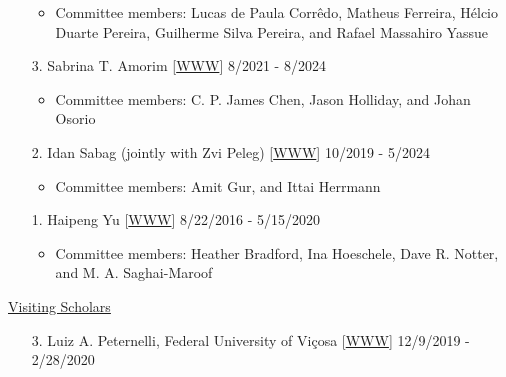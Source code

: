 \documentclass[margin,line,10pt]{res}
\begin{document}
\begin{resume}
\begin{enumerate}
    \begin{itemize}
      \item  Committee members: Lucas de Paula Corr\^{e}do, Matheus Ferreira, H\'{e}lcio Duarte Pereira, Guilherme Silva Pereira, and Rafael Massahiro Yassue
     \end{itemize}

  \vspace{0.3cm}

   \item [3.] Sabrina T. Amorim [\textcolor{blue}{\href{https://sabrinaam.github.io/}{WWW}}]  \hfill  8/2021 - 8/2024

   \begin{itemize}
    \item  Committee members: C. P. James Chen, Jason Holliday, and Johan Osorio 
   \end{itemize}

     \vspace{0.3cm}
    
  \item [2.] Idan Sabag (jointly with Zvi Peleg) [\textcolor{blue}{\href{https://twitter.com/idansabag7}{WWW}}]  \hfill  10/2019 - 5/2024

    \begin{itemize}
     \item  Committee members: Amit Gur, and Ittai Herrmann 
    \end{itemize}
    
    \vspace{0.3cm}

  \item [1.] Haipeng Yu [\textcolor{blue}{\href{https://haipengu.github.io/}{WWW}}]  \hfill 8/22/2016 - 5/15/2020
    \begin{itemize}
     \item  Committee members: Heather Bradford, Ina Hoeschele, Dave R. Notter, and M. A. Saghai-Maroof
    \end{itemize}
\end{enumerate}








\begin{flushleft}
\hspace{0.2cm} \underline{Visiting Scholars}
\end{flushleft}
\begin{enumerate}

\item [3.] Luiz A. Peternelli, Federal University of Vi\c cosa [\textcolor{blue}{\href{http://www.dpi.ufv.br/~peternelli/}{WWW}}]  \hfill 12/9/2019 - 2/28/2020


\end{enumerate}
\end{resume}
\end{document}
